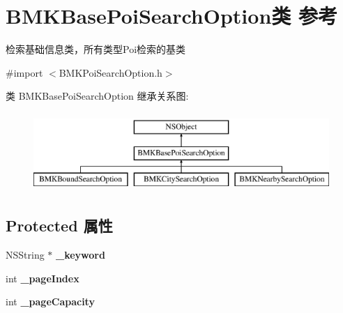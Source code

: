 \hypertarget{interface_b_m_k_base_poi_search_option}{}\section{B\+M\+K\+Base\+Poi\+Search\+Option类 参考}
\label{interface_b_m_k_base_poi_search_option}


检索基础信息类，所有类型\+Poi检索的基类  




{\ttfamily \#import $<$B\+M\+K\+Poi\+Search\+Option.\+h$>$}

类 B\+M\+K\+Base\+Poi\+Search\+Option 继承关系图\+:\begin{figure}[H]
\begin{center}
\leavevmode
\includegraphics[height=3.000000cm]{interface_b_m_k_base_poi_search_option}
\end{center}
\end{figure}
\subsection*{Protected 属性}
\begin{DoxyCompactItemize}
\item 
\hypertarget{interface_b_m_k_base_poi_search_option_aec623956bb8cfc11c5d5959c6cf698da}{}N\+S\+String $\ast$ {\bfseries \+\_\+keyword}\label{interface_b_m_k_base_poi_search_option_aec623956bb8cfc11c5d5959c6cf698da}

\item 
\hypertarget{interface_b_m_k_base_poi_search_option_a9d3de22e269b9f69806e8f0b077d039f}{}int {\bfseries \+\_\+page\+Index}\label{interface_b_m_k_base_poi_search_option_a9d3de22e269b9f69806e8f0b077d039f}

\item 
\hypertarget{interface_b_m_k_base_poi_search_option_aa2e8a12a6101e57ec5e384f1cef92429}{}int {\bfseries \+\_\+page\+Capacity}\label{interface_b_m_k_base_poi_search_option_aa2e8a12a6101e57ec5e384f1cef92429}

\end{DoxyCompactItemize}
